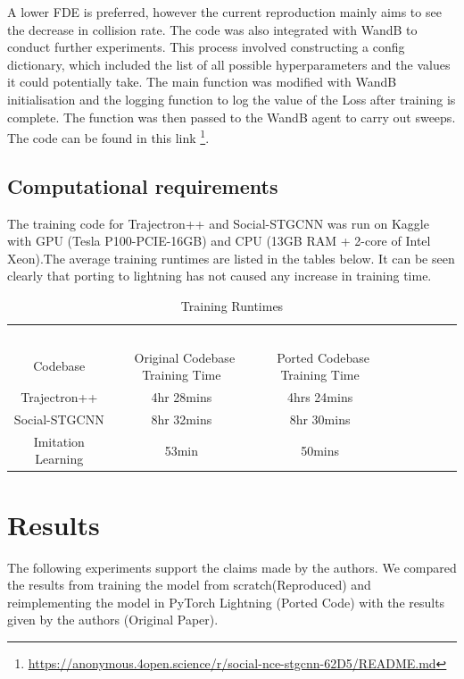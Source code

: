 A lower FDE is preferred, however the current reproduction mainly aims to see the decrease in collision rate. 
The code was also integrated with WandB to conduct further experiments. This process involved constructing a config dictionary, which included the list of all possible hyperparameters and the values it could potentially take. The main function was modified with WandB initialisation and the logging function to log the value of the Loss after training is complete. The function was then passed to the WandB agent to carry out sweeps. The code can be found in this link \footnote{\href{https://anonymous.4open.science/r/social-nce-stgcnn-62D5/README.md}{https://anonymous.4open.science/r/social-nce-stgcnn-62D5/README.md}}.
\subsection{Computational requirements}
The training code for Trajectron++ and Social-STGCNN was run on Kaggle with GPU (Tesla P100-PCIE-16GB) and CPU (13GB RAM + 2-core of Intel Xeon).The average training runtimes are listed in the tables below. It can be seen clearly that porting to lightning has not caused any increase in training time. 

\begin{table}[H]
\caption{Training Runtimes} %
\centering %
\begin{tabular}{ccc rrrrr} 
\hline 
&\ \ \ \ \ \\
Codebase&\ Original Codebase Training Time&\ Ported Codebase Training Time&\ \\ [0.5ex]
\hline 
Trajectron++ &    4hr 28mins & 4hrs 24mins\\
Social-STGCNN &  8hr 32mins & 8hr 30mins\\
Imitation Learning &   53min & 50mins\\
\hline %
\end{tabular}
\label{tab:hresult}
\end{table}


\section{Results}
\label{sec:results}
The following experiments support the claims made by the authors. We compared the results from training the model from scratch(Reproduced) and reimplementing the model in PyTorch Lightning (Ported Code) with the results given by the authors (Original Paper).

